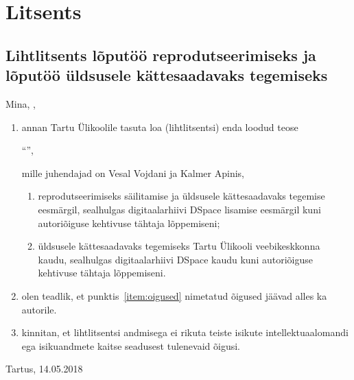 \documentclass[../thesis.tex]{subfiles}
\begin{document}
\section{Litsents}

\subsection*{Lihtlitsents lõputöö reprodutseerimiseks ja lõputöö üldsusele kättesaadavaks tegemiseks}

Mina, \textbf{\myauthor},

\begin{enumerate}
	\item \label{item:oigused} annan Tartu Ülikoolile tasuta loa (lihtlitsentsi) enda loodud teose

	\enquote{\textbf{\mytitle}},

	mille juhendajad on Vesal Vojdani ja Kalmer Apinis,

	\begin{enumerate}[label*=\arabic*.] %
		\item reprodutseerimiseks säilitamise ja üldsusele kättesaadavaks tegemise eesmärgil, sealhulgas digitaalarhiivi DSpace lisamise eesmärgil kuni autoriõiguse kehtivuse tähtaja lõppemiseni;

		\item üldsusele kättesaadavaks tegemiseks Tartu Ülikooli veebikeskkonna kaudu, sealhulgas digitaalarhiivi DSpace kaudu kuni autoriõiguse kehtivuse tähtaja lõppemiseni.
	\end{enumerate}

	\item olen teadlik, et punktis~\ref{item:oigused} nimetatud õigused jäävad alles ka autorile.

	\item kinnitan, et lihtlitsentsi andmisega ei rikuta teiste isikute intellektuaalomandi ega isikuandmete kaitse seadusest tulenevaid õigusi. 
\end{enumerate}

\noindent
Tartus, 14.05.2018
\end{document}
